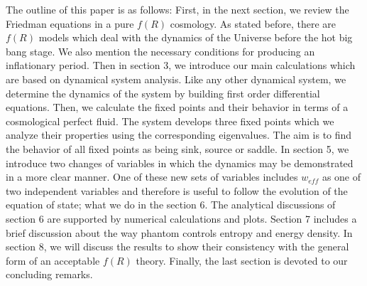\documentclass[a4paper,11pt]{article}
\begin{document}
The outline of this paper is as follows: First, in the next section, we review the Friedman equations in a pure $f(R)$ cosmology. As stated before, there are $f(R)$ models which deal with the dynamics of the Universe before the hot big bang stage. We also mention the necessary conditions for producing an inflationary period. Then in section 3, we introduce our main calculations which are based on dynamical system analysis. Like any other dynamical system, we determine the dynamics of the system by building first order differential equations. Then, we calculate the fixed points and their behavior in terms of a cosmological perfect fluid. The system develops three fixed points which we analyze their properties using the corresponding eigenvalues. The aim is to find the behavior of all fixed points as being sink, source or saddle. In section 5, we introduce two changes of variables in which the dynamics may be demonstrated in a more clear manner. One of these new sets of variables includes $w_{eff}$ as one of two independent variables and therefore is useful to follow the evolution of the equation of state; what we do in the section 6. The analytical discussions of section 6 are supported by numerical calculations and plots. Section 7 includes a brief discussion about the way phantom controls entropy and energy density. In section 8, we will discuss the results to show their consistency with the general form of an acceptable $f(R)$ theory. Finally, the last section is devoted to our concluding remarks.
\end{document}
